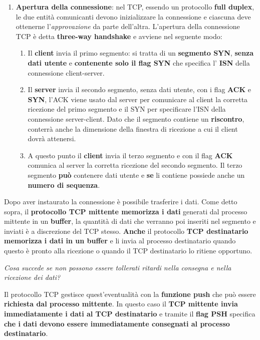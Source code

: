 \documentclass[11pt,a4paper,oneside]{book}
\theoremstyle{definition}
\begin{document}
\begin{enumerate}
	\item \textbf{Apertura della connessione}: nel TCP, essendo un protocollo \textbf{full duplex}, le due entità comunicanti devono inizializzare la connessione e ciascuna deve ottenerne l'\textit{approvazione} da parte dell'altra. L'apertura della connessione TCP è detta \textbf{three-way handshake} e avviene nel seguente modo:
	      \begin{enumerate}[label*=\arabic*.]
		      \item Il \textbf{client} invia il primo segmento: si tratta di un \textbf{segmento SYN}, \textbf{senza dati utente} e \textbf{contenente solo il flag SYN} che specifica l' \textbf{ISN} della connessione client-server.
		      \item Il \textbf{server} invia il secondo segmento, senza dati utente, con i flag \textbf{ACK} e \textbf{SYN}, l'ACK viene usato dal server per comunicare al client la corretta ricezione del primo segmento e il SYN per specificare l'ISN della connessione server-client. Dato che il segmento contiene un \textbf{riscontro}, conterrà anche la dimensione della finestra di ricezione a cui il client dovrà attenersi.
		      \item A questo punto il \textbf{client} invia il terzo segmento e con il flag \textbf{ACK} comunica al server la corretta ricezione del secondo segmento. Il terzo segmento \textbf{può} contenere dati utente e \textbf{se} li contiene possiede anche un \textbf{numero di sequenza}.
	      \end{enumerate}
\end{enumerate}
Dopo aver instaurato la connessione è possibile trasferire i dati. Come detto sopra, il \textbf{protocollo TCP mittente memorizza i dati} generati dal processo mittente in un \textbf{buffer}, la quantità di dati che verranno poi inseriti nel segmento e inviati è a discrezione del TCP stesso. \textbf{Anche} il protocollo \textbf{TCP destinatario memorizza i dati in un buffer} e li invia al processo destinatario quando questo è pronto alla ricezione o quando il TCP destinatario lo ritiene opportuno. \begin{flushleft}
	\textit{Cosa succede se non possono essere tollerati ritardi nella consegna e nella ricezione dei dati?}
\end{flushleft}
Il protocollo TCP gestisce quest'eventualità con la \textbf{funzione push} che può essere \textbf{richiesta dal processo mittente}. In questo caso il \textbf{TCP mittente invia immediatamente i dati al TCP destinatario} e tramite il \textbf{flag PSH} specifica \textbf{che i dati devono essere immediatamente consegnati al processo destinatario}.
\end{document}
